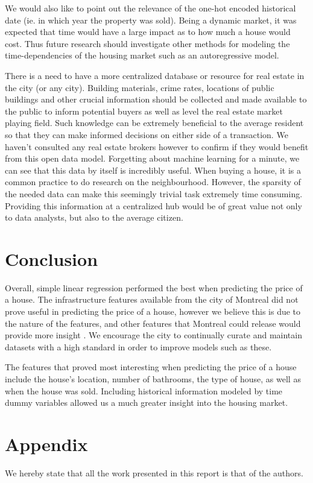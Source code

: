 \documentclass{acm_proc_article-sp}
\begin{document}
	We would also like to point out the relevance of the one-hot encoded historical date (ie. in which year the property was sold). Being a dynamic market, it was expected that time would have a large impact as to how much a house would cost. Thus future research should investigate other methods for modeling the time-dependencies of the housing market such as an autoregressive model.
	
	There is a need to have a more centralized database or resource for real estate in the city (or any city). Building materials, crime rates, locations of public buildings and other crucial information should be collected and made available to the public to inform potential buyers as well as level the real estate market playing field. Such knowledge can be extremely beneficial to the average resident so that they can make informed decisions on either side of a transaction. We haven't consulted any real estate brokers however to confirm if they would benefit from this open data model. Forgetting about machine learning for a minute, we can see that this data by itself is incredibly useful. When buying a house, it is a common practice to do research on the neighbourhood. However, the sparsity of the needed data can make this seemingly trivial task extremely time consuming. Providing this information at a centralized hub would be of great value not only to data analysts, but also to the average citizen.

\section{Conclusion}

	Overall, simple linear regression performed the best when predicting the price of a house. The infrastructure features available from the city of Montreal did not prove useful in predicting the price of a house, however we believe this is due to the nature of the features, and other features that Montreal could release would provide more insight \cite{bostonres}. We encourage the city to continually curate and maintain datasets with a high standard in order to improve models such as these. 
	
	The features that proved most interesting when predicting the price of a house include the house's location, number of bathrooms, the type of house, as well as when the house was sold. Including historical information modeled by time dummy variables allowed us a much greater insight into the housing market.
	
\section{Appendix}
We hereby state that all the work presented in this report is that of the authors.
\end{document}
